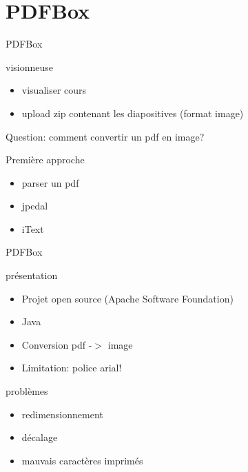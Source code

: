 \section{PDFBox}

\begin{frame}{PDFBox}
  	\begin{block}{visionneuse}
  		 \begin{itemize}
	   		\item visualiser cours
              		\item upload zip contenant les diapositives (format image)
	 	\end{itemize}
  	\end{block}

	Question: comment convertir un pdf en image?

	\begin{block}{Première approche}
  		\begin{itemize}
      			\item parser un pdf
      			\item jpedal
      			\item iText
  		\end{itemize}
	\end{block}
\end{frame}

\begin{frame}{PDFBox}
	\begin{block}{présentation}
		\begin{itemize}
			\item Projet open source (Apache Software Foundation)
			\item Java 
			\item Conversion pdf -$>$ image
			\item Limitation: police arial!
		\end{itemize}
	\end{block}

	\begin{block}{problèmes}
		\begin{itemize}
			\item redimensionnement
			\item décalage
			\item mauvais caractères imprimés
		\end{itemize}
	\end{block}
\end{frame}

